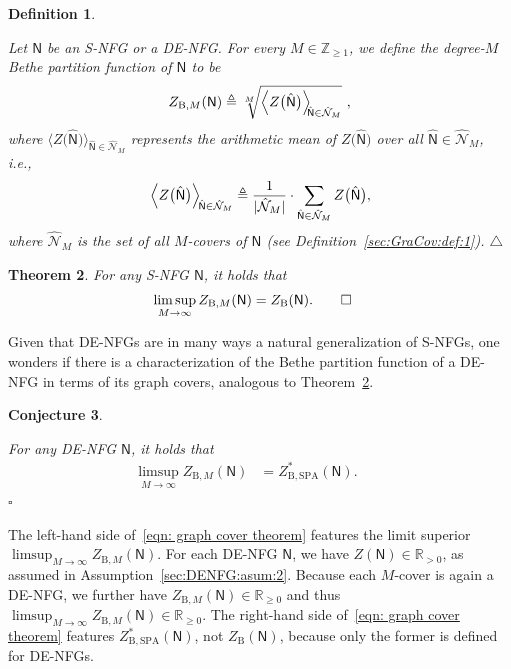 \documentclass[journal]{IEEEtran}
\newcommand{\add}[1]{{\color{black}#1}}
\newtheorem{theorem}{Theorem}
\newtheorem{conjecture}[theorem]{Conjecture}
\newtheorem{definition}[theorem]{Definition}
\newcommand{\manualendsymbol}[1]{%
  \leavevmode\unskip\penalty9999\hbox{}\nobreak\hfill
  \quad\hbox{#1}}
\newcommand{\edefinition}{\manualendsymbol{\ensuremath{\triangle}}}
\newcommand{\set}[1]{\mathcal{#1}}
\newcommand{\sfN}{ \mathsf{N} }
\newcommand{\ZB}{Z_{ \mathrm{B} }}
\newcommand{\graphN}{ \mathsf{N} }
\newcommand{\defeq}{ \triangleq }
\newcommand{\sRp}{ \mathbb{R}_{\geq 0} }
\newcommand{\sRpp}{ \mathbb{R}_{> 0} }
\newcommand{\sZpp}{ \mathbb{Z}_{\geq 1} }
\newcommand{\ZBSPA}{ Z_{\mathrm{B,SPA}} }
\newcommand{\ZBM}{ Z_{\mathrm{B},M} }
\newcommand{\hgraphN}{ \hat{\graphN} }
\newcommand*{\ie}{\textit{i.e.}}
\begin{document}
\begin{definition}\label{sec:GraCov:def:2}

  Let $\graphN$ be an S-NFG or a DE-NFG. For every $M \in \sZpp$, we define
  the degree-$M$ Bethe partition function of $\graphN$ to be
  \begin{align*}
    \ZBM(\graphN)
    \defeq \sqrt[M]{
             \Bigl\langle
             Z\bigl( \hgraphN \bigr)
             \Bigr\rangle_{ \! \! \hgraphN \in \hat{\set{N}}_{M}}
           } \ ,
  \end{align*}
  where
  $\bigl\langle Z\bigl( \hgraphN \bigr) \bigr\rangle_{\! \hgraphN \in \hat{\set{N}}_{M}}$
  represents the arithmetic mean of
  $Z\bigl( \hgraphN \bigr)$ over all $\hgraphN \in \hat{\set{N}}_{M}$, \ie,
  \begin{align*}
    \Bigl\langle
    Z\bigl( \hgraphN \bigr)
    \Bigr\rangle_{\! \hgraphN \in \hat{\set{N}}_{M}}
    \defeq \frac{1}{|\hat{\set{N}}_{M}|}
    \cdot \sum_{ \hgraphN \in \hat{\set{N}}_{M} } Z\bigl( \hgraphN \bigr),
  \end{align*}
  where
  $\hat{\set{N}}_{M}$ is the set of all $M$-covers of $\graphN$ (see
  Definition~\ref{sec:GraCov:def:1}).
  \edefinition
\end{definition}

\begin{theorem}\!\!\cite{Vontobel2013}
  \label{sec:GraCov:thm:1}
  \add{For any S-NFG $\graphN$, it holds that}
  \begin{align*}
    \limsup_{M\to \infty}
    \ZBM(\graphN)
     & = \ZB(\graphN). \tag*{\ensuremath{\square}}
    \nonumber
  \end{align*}
\end{theorem}

Given that DE-NFGs are in many ways a natural generalization of
S-NFGs, one wonders if there is a characterization of the Bethe partition
function of a DE-NFG in terms of its graph covers,
analogous to Theorem~\ref{sec:GraCov:thm:1}.

\begin{conjecture}
  \label{sec:GraCov:conj:1}

  \add{For any DE-NFG $\graphN$, it holds that}
  \begin{align}
    \limsup_{M\to \infty}
    \ZBM(\graphN)
     & = \ZBSPA^{*}(\graphN). \qquad \label{eqn: graph cover theorem}
  \end{align}
  \hfill$\square$
\end{conjecture}
The left-hand side of~\eqref{eqn: graph cover theorem}
features the limit superior $ \limsup_{M\to \infty} \ZBM(\graphN) $. For each DE-NFG $ \sfN $, we have $ Z(\graphN) \in \sRpp $, as assumed in Assumption~\ref{sec:DENFG:asum:2}. Because each $M$-cover is again a DE-NFG, we further have $ \ZBM(\graphN) \in \sRp $ and thus $ \limsup_{M\to \infty} \ZBM(\graphN) \in \sRp $.
The right-hand side of~\eqref{eqn: graph cover theorem}
features $\ZBSPA^{*}(\graphN)$, not $\ZB(\graphN)$, because only the
former is defined for DE-NFGs.
\end{document}
